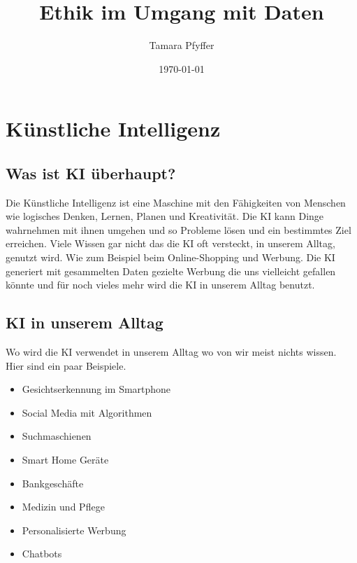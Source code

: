 \documentclass{report}
\title{Ethik im Umgang mit Daten}
\author{Tamara Pfyffer}
\date{\today}
\begin{document}
\maketitle

\tableofcontents

\chapter{Künstliche Intelligenz}

\section{Was ist KI überhaupt?}
Die Künstliche Intelligenz ist eine Maschine mit den Fähigkeiten von Menschen wie logisches Denken, Lernen, Planen und Kreativität. Die KI kann
Dinge wahrnehmen mit ihnen umgehen und so Probleme lösen und ein bestimmtes Ziel erreichen. Viele Wissen gar nicht das die KI oft versteckt,
in unserem Alltag, genutzt wird. Wie zum Beispiel beim Online-Shopping
und Werbung. Die KI generiert mit gesammelten Daten gezielte Werbung
die uns vielleicht gefallen könnte und für noch vieles mehr wird die KI in
unserem Alltag benutzt. 
\section{KI in unserem Alltag}
Wo wird die KI verwendet in unserem Alltag wo von wir meist nichts wissen. Hier sind ein paar Beispiele.
\begin{itemize}
    \item Gesichtserkennung im Smartphone
    \item Social Media mit Algorithmen
    \item Suchmaschienen
    \item Smart Home Geräte
    \item Bankgeschäfte
    \item Medizin und Pflege
    \item Personalisierte Werbung
    \item Chatbots
\end{itemize}
\end{document}
